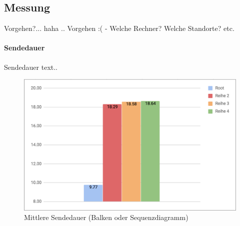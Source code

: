 \documentclass[paper=a4, fontsize=11pt]{scrartcl} %
\numberwithin{equation}{section} %
\numberwithin{figure}{section} %
\numberwithin{table}{section} %
\begin{document}
\subsection{Messung}

Vorgehen?... haha .. Vorgehen :( - Welche Rechner? Welche Standorte? etc.

\paragraph{Sendedauer}

Sendedauer text..

\begin{figure}[H]
  \centering
  \includegraphics[width=0.7\linewidth]{imgs/put-led-response-time.png}
  \caption{Mittlere Sendedauer (Balken oder Sequenzdiagramm)}
  \label{fig:sendedauer}
\end{figure}
\end{document}
